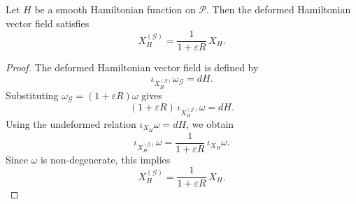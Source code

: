 \documentclass[10pt,a4paper]{amsart}
\begin{document}
\begin{proposition}
Let $H$ be a smooth Hamiltonian function on $\mathcal{P}$. Then the deformed
Hamiltonian vector field satisfies
\[
X_H^{(\mathcal{G})} = \frac{1}{1+\varepsilon R}\,X_H.
\]
\end{proposition}

\begin{proof}
The deformed Hamiltonian vector field is defined by
\[
\iota_{X_H^{(\mathcal{G})}}\omega_{\mathcal{G}} = dH.
\]
Substituting $\omega_{\mathcal{G}}=(1+\varepsilon R)\omega$ gives
\[
(1+\varepsilon R)\,\iota_{X_H^{(\mathcal{G})}}\omega = dH.
\]
Using the undeformed relation $\iota_{X_H}\omega=dH$, we obtain
\[
\iota_{X_H^{(\mathcal{G})}}\omega
= \frac{1}{1+\varepsilon R}\,\iota_{X_H}\omega.
\]
Since $\omega$ is non-degenerate, this implies
\[
X_H^{(\mathcal{G})} = \frac{1}{1+\varepsilon R}\,X_H.
\]
\end{proof}
\end{document}
